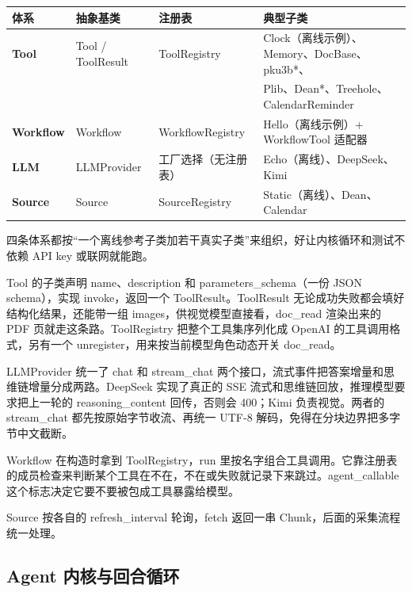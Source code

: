 \documentclass[UTF8,a4paper,11pt,fontset=none]{ctexart}
\newcommand{\code}[1]{{\ttfamily\small #1}}
\begin{document}
\begin{center}
\small
\begin{tabular}{@{}>{\bfseries}l l l l@{}}
\toprule
\rowcolor{seambg}\textbf{体系} & \textbf{抽象基类} & \textbf{注册表} & \textbf{典型子类} \\
\midrule
Tool & \code{Tool / ToolResult} & \code{ToolRegistry} & Clock（离线示例）、Memory、DocBase、pku3b*、\\
 & & & Plib、Dean*、Treehole、CalendarReminder \\
Workflow & \code{Workflow} & \code{WorkflowRegistry} & Hello（离线示例）+ \code{WorkflowTool} 适配器 \\
LLM & \code{LLMProvider} & 工厂选择（无注册表） & Echo（离线）、DeepSeek、Kimi \\
Source & \code{Source} & \code{SourceRegistry} & Static（离线）、Dean、Calendar \\
\bottomrule
\end{tabular}
\end{center}

四条体系都按“一个离线参考子类加若干真实子类”来组织，好让内核循环和测试不依赖 API key 或联网就能跑。

Tool 的子类声明 \code{name}、\code{description} 和 \code{parameters\_schema}（一份 JSON schema），实现 \code{invoke}，返回一个 \code{ToolResult}。\code{ToolResult} 无论成功失败都会填好结构化结果，还能带一组 \code{images}，供视觉模型直接看，\code{doc\_read} 渲染出来的 PDF 页就走这条路。\code{ToolRegistry} 把整个工具集序列化成 OpenAI 的工具调用格式，另有一个 \code{unregister}，用来按当前模型角色动态开关 \code{doc\_read}。

LLMProvider 统一了 \code{chat} 和 \code{stream\_chat} 两个接口，流式事件把答案增量和思维链增量分成两路。DeepSeek 实现了真正的 SSE 流式和思维链回放，推理模型要求把上一轮的 \code{reasoning\_content} 回传，否则会 400；Kimi 负责视觉。两者的 \code{stream\_chat} 都先按原始字节收流、再统一 UTF-8 解码，免得在分块边界把多字节中文截断。

Workflow 在构造时拿到 \code{ToolRegistry}，\code{run} 里按名字组合工具调用。它靠注册表的成员检查来判断某个工具在不在，不在或失败就记录下来跳过。\code{agent\_callable} 这个标志决定它要不要被包成工具暴露给模型。

Source 按各自的 \code{refresh\_interval} 轮询，\code{fetch} 返回一串 \code{Chunk}，后面的采集流程统一处理。

\subsection{Agent 内核与回合循环}
\end{document}
